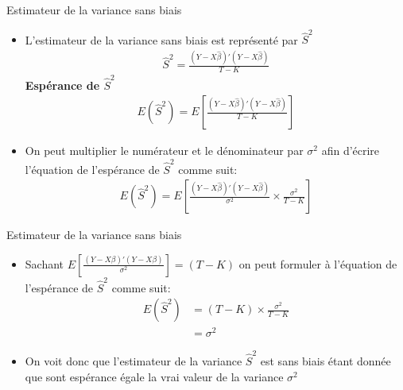 \documentclass{beamer}
\begin{document}
\frame{\tableofcontents[current]}


\begin{frame}{Estimateur de la variance sans biais}
\begin{itemize}
\item L'estimateur de la variance sans biais est représenté par $\hat{S}^2$
\begin{align*}
\hat{S}^2=\frac{(Y-X \hat{\beta})'(Y-X \hat{\beta})}{T-K}
\end{align*}
\textbf{Espérance de $\hat{S}^2$}
\begin{align*}
E(\hat{S}^2)=E \left[ \frac{(Y-X \hat{\beta})'(Y-X \hat{\beta})}{T-K}\right]
\end{align*}
\item On peut multiplier le numérateur et le dénominateur par $\sigma^2$ afin d'écrire l'équation de l'espérance de $\hat{S}^2$ comme suit:
\begin{align*}
E(\hat{S}^2)=E \left[ \frac{(Y-X \hat{\beta})'(Y-X \hat{\beta})}{\sigma^2} \times \frac{\sigma^2}{T-K}\right]
\end{align*}
\end{itemize}
\end{frame}

\begin{frame}{Estimateur de la variance sans biais}
\begin{itemize}
\item Sachant $E \left[ \frac{(Y-X \beta)'(Y-X \beta)}{\sigma^2}\right]=(T-K)$ on peut formuler à l'équation de l'espérance de $\hat{S}^2$ comme suit:
\begin{align*}
E(\hat{S}^2) & =(T-K) \times \frac{\sigma^2}{T-K} \\ & = \sigma^2
\end{align*}
\item On voit donc que l'estimateur de la variance $\hat{S}^2$ est sans biais étant donnée que sont espérance égale la vrai valeur de la variance $\sigma^2$
\end{itemize}
\end{frame}
\end{document}
